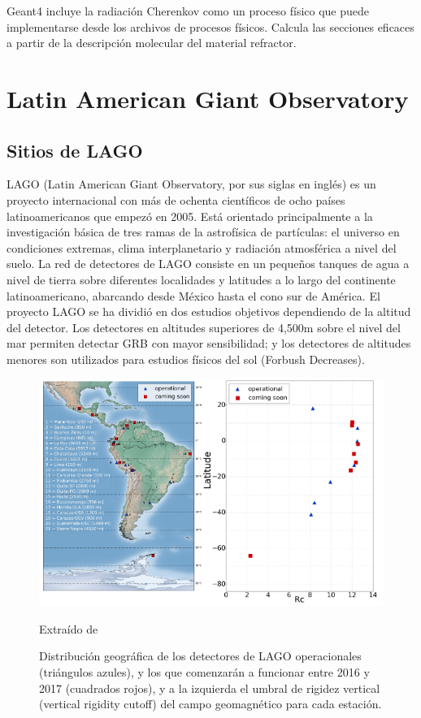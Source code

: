 \documentclass{book}
\begin{document}
Geant4 incluye la radiaci\'on Cherenkov como un proceso f\'isico que puede implementarse desde los archivos de procesos f\'isicos. Calcula las secciones eficaces a partir de la descripci\'on molecular del material refractor. 



\section{Latin American Giant Observatory}
\subsection{Sitios de LAGO}
LAGO (Latin American Giant Observatory, por sus siglas en ingl\'es) es un proyecto internacional con m\'as de ochenta cient\'ificos de ocho pa\'ises latinoamericanos que empez\'o en 2005. Est\'a orientado principalmente a la investigaci\'on b\'asica de tres ramas de la astrof\'isica de part\'iculas: el universo en condiciones extremas, clima interplanetario y radiaci\'on atmosf\'erica a nivel del suelo. La red de detectores de LAGO consiste en un peque\~nos tanques de agua a nivel de tierra sobre diferentes localidades y latitudes a lo largo del continente latinoamericano, abarcando desde M\'exico hasta el cono sur de Am\'erica. El proyecto LAGO se ha dividi\'o en dos estudios objetivos dependiendo de la altitud del detector. Los detectores en altitudes superiores de 4,500m sobre el nivel del mar permiten detectar GRB con mayor sensibilidad; y los detectores de altitudes menores son utilizados para estudios f\'isicos del sol (Forbush Decreases). \citep{ASOREY2015}

\begin{figure}[ht] %
\begin{center}
 \includegraphics[width = 0.8\linewidth]{ASOREY2015.png}
 
 Extra\'ido de \citep{ASOREY2015}
\caption{Distribuci\'on geogr\'afica de los detectores de LAGO operacionales (tri\'angulos azules), y los que comenzar\'an a funcionar entre 2016 y 2017 (cuadrados rojos), y a la izquierda el umbral de rigidez vertical (vertical rigidity cutoff) del campo geomagn\'etico para cada estaci\'on.}
\end{center}
\end{figure}
\end{document}
